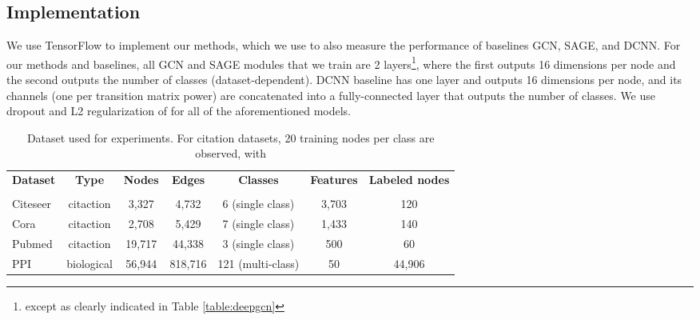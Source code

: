\subsection{Implementation}
We use TensorFlow\citep{tensorflow} to implement our methods, which we use to also measure the performance of baselines GCN, SAGE, and DCNN.
For our methods and baselines, all GCN and SAGE modules that we train are 2 layers\footnote{except as clearly indicated in Table \ref{table:deepgcn}}, where the first outputs 16 dimensions per node and the second outputs the number of classes (dataset-dependent). DCNN baseline has one layer and outputs 16 dimensions per node, and its channels (one per transition matrix power) are concatenated into a fully-connected layer that outputs the number of classes.
We use  dropout and L2 regularization of  for all of the aforementioned models.








\begin{table*}[t]
\begin{center}
\begin{tabular}{lcccccc}
\textbf{Dataset} 
&\textbf{Type}
& \textbf{Nodes}
&\textbf{Edges}
&\textbf{Classes}
& \textbf{Features}
& \textbf{Labeled nodes}
\\
& &  &  &  &  & 
\\ \hline
Citeseer    & citaction      &3,327 &4,732 &6  (single class)&3,703 & 120 \\
Cora          & citaction   &2,708 &5,429 &7 (single class) &1,433 & 140 \\
Pubmed     & citaction         &19,717 &44,338 &3 (single class)&500 & 60 \\
PPI           & biological   & 56,944&  818,716   & 121 (multi-class) & 50 & 44,906 \\
\end{tabular}
\end{center}
\caption{Dataset used for experiments.
	For citation datasets, 20 training nodes per class are observed, with 
}
\label{table:dataset-stats}
\end{table*}


